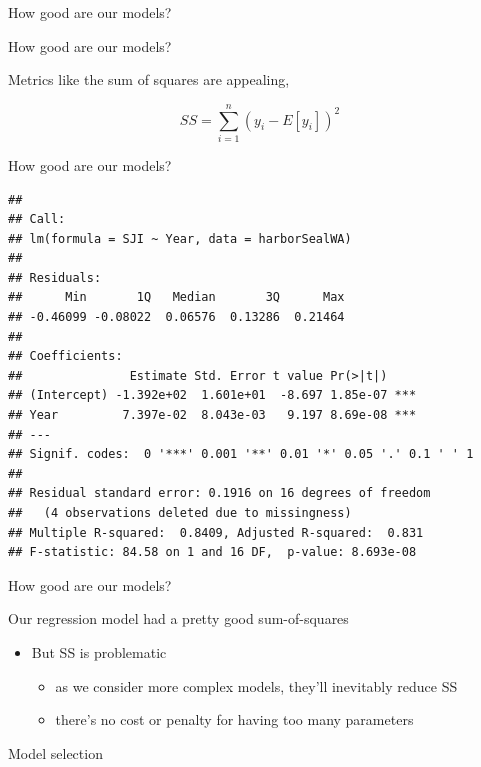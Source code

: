 \documentclass[ignorenonframetext,]{beamer}
\providecommand{\tightlist}{%
  \setlength{\itemsep}{0pt}\setlength{\parskip}{0pt}}
\begin{document}
\begin{frame}[fragile]
\begin{block}{How good are our models?}
\end{block}

\begin{block}{How good are our models?}

Metrics like the sum of squares are appealing,

\[SS=\sum _{ i=1 }^{ n }{ { \left( y_{ i }-E[{ y }_{ i }] \right)  }^{ 2 } } \]

\end{block}

\begin{block}{How good are our models?}

\begin{verbatim}
## 
## Call:
## lm(formula = SJI ~ Year, data = harborSealWA)
## 
## Residuals:
##      Min       1Q   Median       3Q      Max 
## -0.46099 -0.08022  0.06576  0.13286  0.21464 
## 
## Coefficients:
##               Estimate Std. Error t value Pr(>|t|)    
## (Intercept) -1.392e+02  1.601e+01  -8.697 1.85e-07 ***
## Year         7.397e-02  8.043e-03   9.197 8.69e-08 ***
## ---
## Signif. codes:  0 '***' 0.001 '**' 0.01 '*' 0.05 '.' 0.1 ' ' 1
## 
## Residual standard error: 0.1916 on 16 degrees of freedom
##   (4 observations deleted due to missingness)
## Multiple R-squared:  0.8409, Adjusted R-squared:  0.831 
## F-statistic: 84.58 on 1 and 16 DF,  p-value: 8.693e-08
\end{verbatim}

\end{block}

\begin{block}{How good are our models?}

Our regression model had a pretty good sum-of-squares

\begin{itemize}
\tightlist
\item
  But SS is problematic

  \begin{itemize}
  \tightlist
  \item
    as we consider more complex models, they'll inevitably reduce SS
  \item
    there's no cost or penalty for having too many parameters
  \end{itemize}
\end{itemize}

\end{block}

\begin{block}{Model selection}


\end{block}
\end{frame}
\end{document}
